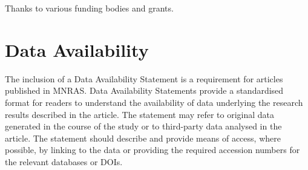 \documentclass[fleqn,usenatbib,useAMS]{mnras}
\begin{document}
Thanks to various funding bodies and grants.

\section*{Data Availability}
 
The inclusion of a Data Availability Statement is a requirement for articles published in MNRAS. Data Availability Statements provide a standardised format for readers to understand the availability of data underlying the research results described in the article. The statement may refer to original data generated in the course of the study or to third-party data analysed in the article. The statement should describe and provide means of access, where possible, by linking to the data or providing the required accession numbers for the relevant databases or DOIs.




\bsp
\label{lastpage}
\end{document}
